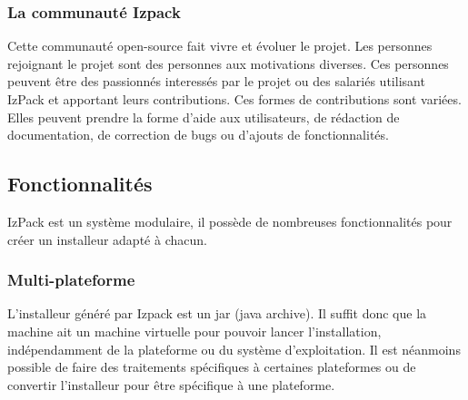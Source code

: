 \subsubsection{La communauté Izpack}
Cette communauté open-source fait vivre et évoluer le projet. Les personnes rejoignant le projet sont des personnes aux motivations diverses.
Ces personnes peuvent être des passionnés interessés par le projet ou des salariés utilisant IzPack et apportant leurs contributions.
Ces formes de contributions sont variées.
Elles peuvent prendre la forme d'aide aux utilisateurs, de rédaction de documentation, de correction de bugs ou d'ajouts de fonctionnalités.
\subsection{Fonctionnalités}
IzPack est un système modulaire, il possède de nombreuses fonctionnalités pour créer un installeur adapté à chacun.
\subsubsection{Multi-plateforme}
L'installeur généré par Izpack est un jar (java archive).
Il suffit donc que la machine ait un machine virtuelle pour pouvoir lancer l'installation, indépendamment de la plateforme ou du système d'exploitation.
Il est néanmoins possible de faire des traitements spécifiques à certaines plateformes ou de convertir l'installeur pour être spécifique à une plateforme.
